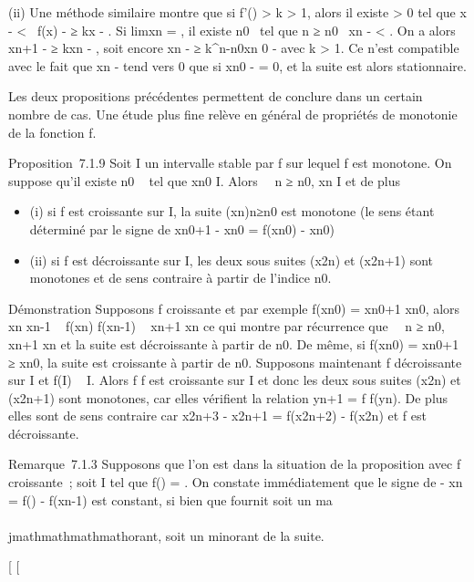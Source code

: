 (ii) Une méthode similaire montre que si \textbar{}f'(\ell)\textbar{}
\textgreater{} k \textgreater{} 1, alors il existe \eta \textgreater{} 0
tel que \textbar{}x - \ell\textbar{} \textless{} \eta \rigtharrow~\textbar{}f(x) -
\ell\textbar{}≥ k\textbar{}x - \ell\textbar{}. Si
limxn = \ell, il existe n0~
tel que n ≥ n0 \rigtharrow~\textbar{}xn - \ell\textbar{}
\textless{} \eta. On a alors \textbar{}xn+1 - \ell\textbar{}≥
k\textbar{}xn - \ell\textbar{}, soit encore
\textbar{}xn - \ell\textbar{}≥
k^n-n0\textbar{}xn 0 -
\ell\textbar{} avec k \textgreater{} 1. Ce n'est compatible avec le fait
que xn - \ell tend vers 0 que si xn0 - \ell = 0,
et la suite est alors stationnaire.

Les deux propositions précédentes permettent de conclure dans un certain
nombre de cas. Une étude plus fine relève en général de propriétés de
monotonie de la fonction f.

Proposition~7.1.9 Soit I un intervalle stable par f sur lequel f est
monotone. On suppose qu'il existe n0 \in {}~ tel que
xn0 \in I. Alors \forall~~n ≥
n0, xn \in I et de plus

\begin{itemize}
\itemsep1pt\parskip0pt
\item
  (i) si f est croissante sur I, la suite
  (xn)n≥n0 est monotone (le sens étant
  déterminé par le signe de xn0+1 -
  xn0 = f(xn0) -
  xn0)
\item
  (ii) si f est décroissante sur I, les deux sous suites (x2n)
  et (x2n+1) sont monotones et de sens contraire à partir de
  l'indice n0.
\end{itemize}

Démonstration Supposons f croissante et par exemple
f(xn0) = xn0+1 \leq
xn0, alors xn \leq xn-1 \rigtharrow~
f(xn) \leq f(xn-1) \rigtharrow~ xn+1 \leq xn ce
qui montre par récurrence que \forall~~n ≥
n0, xn+1 \leq xn et la suite est décroissante
à partir de n0. De même, si f(xn0) =
xn0+1 ≥ xn0, la suite est
croissante à partir de n0. Supposons maintenant f décroissante
sur I et f(I) \subset~ I. Alors f \cdot f est croissante sur I et donc les deux
sous suites (x2n) et (x2n+1) sont monotones, car
elles vérifient la relation yn+1 = f \cdot f(yn). De
plus elles sont de sens contraire car x2n+3 - x2n+1
= f(x2n+2) - f(x2n) et f est décroissante.

Remarque~7.1.3 Supposons que l'on est dans la situation de la
proposition avec f croissante~; soit \ell \in I tel que f(\ell) = \ell. On constate
immédiatement que le signe de \ell - xn = f(\ell) -
f(xn-1) est constant, si bien que \ell fournit soit un ma\\\\jmathmathmathmathorant,
soit un minorant de la suite.

{[}
{[}
